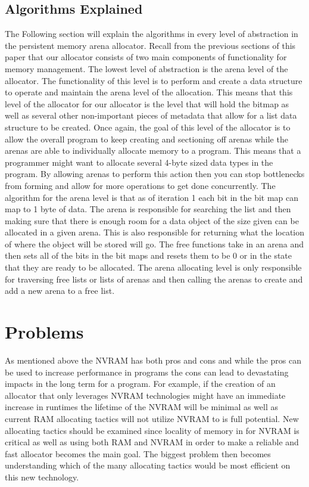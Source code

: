 \documentclass[conference]{IEEEtran}
\begin{document}
\subsection{Algorithms Explained}
The Following section will explain the algorithms in every level of abstraction in the persistent memory arena allocator. Recall from the previous sections of this paper that our allocator consists of two main components of functionality for memory management. The lowest level of abstraction is the arena level of the allocator. The functionality of this level is to perform and create a data structure to operate and maintain the arena level of the allocation. This means that this level of the allocator for our allocator is the level that will hold the bitmap as well as several other non-important pieces of metadata that allow for a list data structure to be created. Once again, the goal of this level of the allocator is to allow the overall program to keep creating and sectioning off arenas while the arenas are able to individually allocate memory to a program. This means that a programmer might want to allocate several 4-byte sized data types in the program. By allowing arenas to perform this action then you can stop bottlenecks from forming and allow for more operations to get done concurrently. The algorithm for the arena level is that as of iteration 1 each bit in the bit map can map to 1 byte of data. The arena is responsible for searching the list and then making sure that there is enough room for a data object of the size given can be allocated in a given arena. This is also responsible for returning what the location of where the object will be stored will go. The free functions take in an arena and then sets all of the bits in the bit maps and resets them to be 0 or in the state that they are ready to be allocated. The arena allocating level is only responsible for traversing free lists or lists of arenas and then calling the arenas to create and add a new arena to a free list.  

\section{Problems}
As mentioned above the NVRAM has both pros and cons and while the pros can be used to increase performance in programs the cons can lead to devastating impacts in the long term for a program. For example, if the creation of an allocator that only leverages NVRAM technologies might have an immediate increase in runtimes the lifetime of the NVRAM will be minimal as well as current RAM allocating tactics will not utilize NVRAM to is full potential. New allocating tactics should be examined since locality of memory in for NVRAM is critical as well as using both RAM and NVRAM in order to make a reliable and fast allocator becomes the main goal. The biggest problem then becomes understanding which of the many allocating tactics would be most efficient on this new technology. 
\end{document}
